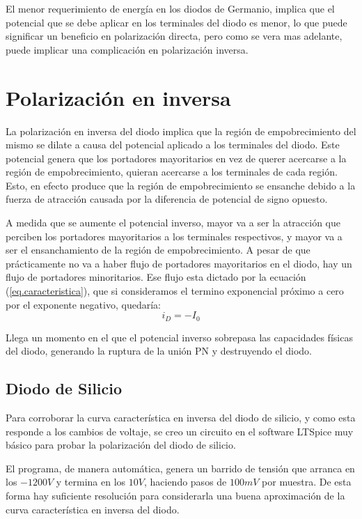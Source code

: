 \documentclass[chaptersright]{informeutn}
\begin{document}
        El menor requerimiento de energía en los diodos de Germanio, implica que el potencial que se debe aplicar en los
        terminales del diodo es menor, lo que puede significar un beneficio en polarización directa, pero como se vera
        mas adelante, puede implicar una complicación en polarización inversa.

    \section{Polarización en inversa}
      La polarización en inversa del diodo implica que la región de empobrecimiento del mismo se dilate a causa del
      potencial aplicado a los terminales del diodo. Este potencial genera que los portadores mayoritarios en vez de
      querer acercarse a la región de empobrecimiento, quieran acercarse a los terminales de cada región. Esto, en
      efecto produce que la región de empobrecimiento se ensanche debido a la fuerza de atracción causada por la
      diferencia de potencial de signo opuesto.

      A medida que se aumente el potencial inverso, mayor va a ser la atracción que perciben los portadores
      mayoritarios a los terminales respectivos, y mayor va a ser el ensanchamiento de la región de empobrecimiento.
      A pesar de que prácticamente no va a haber flujo de portadores mayoritarios en el diodo, hay un flujo de
      portadores minoritarios. Ese flujo esta dictado por la ecuación (\ref{eq.caracteristica}), que si consideramos
      el termino exponencial próximo a cero por el exponente negativo, quedaría:
      \begin{equation*}
        i_D = -I_0
      \end{equation*}

      Llega un momento en el que el potencial inverso sobrepasa las capacidades físicas del diodo, generando la
      ruptura de la unión PN y destruyendo el diodo.

      \subsection{Diodo de Silicio}
        Para corroborar la curva característica en inversa del diodo de silicio, y como esta responde a los cambios de
        voltaje, se creo un circuito en el software LTSpice muy básico para probar la polarización del diodo de
        silicio.

        El programa, de manera automática, genera un barrido de tensión que arranca en los $-1200V$ y termina en los
        $10V$, haciendo pasos de $100mV$ por muestra. De esta forma hay suficiente resolución para considerarla una
        buena aproximación de la curva característica en inversa del diodo.
\end{document}
